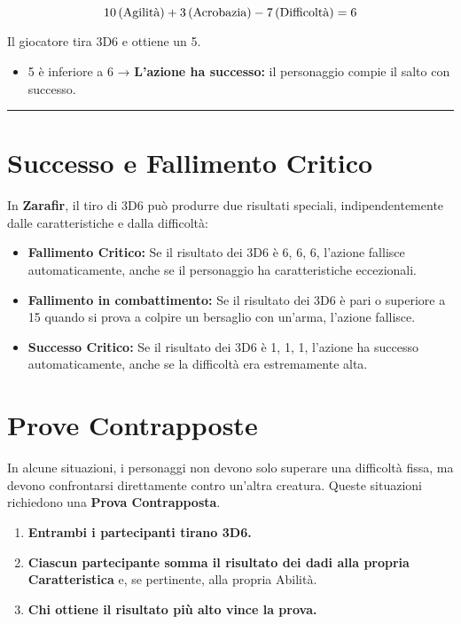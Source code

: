 \documentclass[../manuale_main.tex]{subfiles}
\begin{document}
\[
10 \, (\textnormal{Agilità}) + 3 \, (\textnormal{Acrobazia}) - 7 \, (\textnormal{Difficoltà}) = 6
\]

Il giocatore tira 3D6 e ottiene un 5.

\begin{itemize}
 \item 5 è inferiore a 6 → \textbf{L'azione ha successo:} il personaggio compie il salto con successo.
\end{itemize}

\vspace{0.5cm}
\noindent
\begin{center}
\rule{\textwidth}{0.4pt} 
\end{center}
\vspace{0.5cm}

\section*{Successo e Fallimento Critico}
In \textbf{Zarafir}, il tiro di 3D6 può produrre due risultati speciali, indipendentemente dalle caratteristiche e dalla difficoltà:

\begin{itemize}
\item \textbf{Fallimento Critico:} Se il risultato dei 3D6 è 6, 6, 6, l'azione fallisce automaticamente, anche se il personaggio ha caratteristiche eccezionali.
\item \textbf{Fallimento in combattimento:} Se il risultato dei 3D6 è pari o superiore a 15 quando si prova a colpire un bersaglio con un'arma, l'azione fallisce.
\item \textbf{Successo Critico:} Se il risultato dei 3D6 è 1, 1, 1, l'azione ha successo automaticamente, anche se la difficoltà era estremamente alta.
\end{itemize}

\vspace{0.3cm}

\section{Prove Contrapposte}
In alcune situazioni, i personaggi non devono solo superare una difficoltà fissa, ma devono confrontarsi direttamente contro un’altra creatura. Queste situazioni richiedono una \textbf{Prova Contrapposta}.

\begin{enumerate}
 \item \textbf{Entrambi i partecipanti tirano 3D6.}
 \item \textbf{Ciascun partecipante somma il risultato dei dadi alla propria Caratteristica} e, se pertinente, alla propria Abilità.
 \item \textbf{Chi ottiene il risultato più alto vince la prova.}
\end{enumerate}
\end{document}
